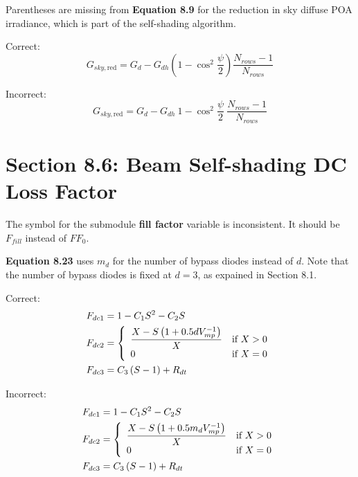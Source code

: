 \documentclass[report]{nrel}
\begin{document}
Parentheses are missing from \textbf{Equation 8.9} for the reduction in sky diffuse POA irradiance, which is part of the self-shading algorithm.

Correct:
\begin{equation*}
G_{sky,\text{red}} = G_d - G_{dh}\left(1 - \cos^2\frac{\psi}{2}\right)\frac{N_{rows} - 1}{N_{rows}}
\end{equation*}

Incorrect:
\begin{equation*}
G_{sky,\text{red}} = G_d - G_{dh}~ 1 - \cos^2\frac{\psi}{2}~ \frac{N_{rows} - 1}{N_{rows}}
\end{equation*}

\section*{Section 8.6: Beam Self-shading DC Loss Factor}

The symbol for the submodule \textbf{fill factor} variable is inconsistent. It should be $F_{fill}$ instead of $\mathit{FF}_0$.

\textbf{Equation 8.23} uses $m_d$ for the number of bypass diodes instead of $d$. Note that the number of bypass diodes is fixed at $d=3$, as expained in Section 8.1.

Correct:
\begin{align*}
F_{dc1} &= 1-C_1S^2-C_2S \notag\\ %
F_{dc2} &= 
\left\{
   \begin{array}{ll}
      \dfrac{X-S\left(1+0.5 d V^{-1}_{mp}\right)}{X} & \text{if $X>0$}\\
      0 & \text{if $X=0$}\\
   \end{array}
\right. \notag\\ %
F_{dc3} &= C_3\left(S-1\right)+R_{dt} %
\end{align*}

Incorrect:
\begin{align*}
F_{dc1} &= 1-C_1S^2-C_2S \notag\\ %
F_{dc2} &= 
\left\{
   \begin{array}{ll}
      \dfrac{X-S\left(1+0.5 m_d V^{-1}_{mp}\right)}{X} & \text{if $X>0$}\\
      0 & \text{if $X=0$}\\
   \end{array}
\right. \notag\\ %
F_{dc3} &= C_3\left(S-1\right)+R_{dt} %
\end{align*}
\end{document}
